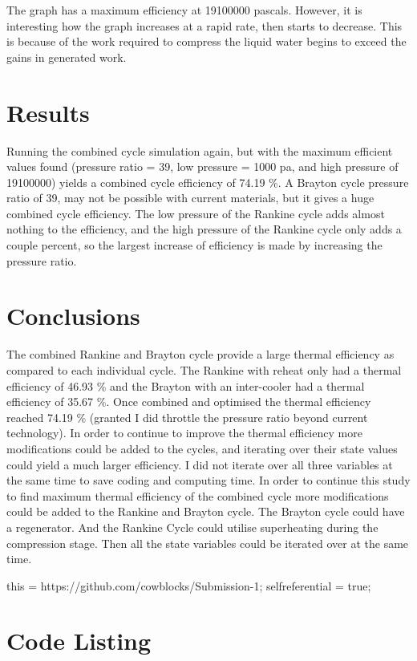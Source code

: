 \documentclass{article}
\begin{document}
\FloatBarrier

The graph has a maximum efficiency at 19100000 pascals. However, it is interesting how the graph increases at a rapid rate, then starts to decrease. This is because of the work required to compress the liquid water begins to exceed the gains in generated work.

\section{Results}

Running the combined cycle simulation again, but with the maximum efficient values found (pressure ratio = 39, low pressure = 1000 pa, and high pressure of 19100000) yields a combined cycle efficiency of 74.19 \%. A Brayton cycle pressure ratio of 39, may not be possible with current materials, but it gives a huge combined cycle efficiency. The low pressure of the Rankine cycle adds almost nothing to the efficiency, and the high pressure of the Rankine cycle only adds a couple percent, so the largest increase of efficiency is made by increasing the pressure ratio.

\section{Conclusions}

The combined Rankine and Brayton cycle provide a large thermal efficiency as compared to each individual cycle. The Rankine with reheat only had a thermal efficiency of 46.93 \% and the Brayton with an inter-cooler had a thermal efficiency of 35.67 \%. Once combined and optimised the thermal efficiency reached 74.19 \% (granted I did throttle the pressure ratio beyond current technology). In order to continue to improve the thermal efficiency more modifications could be added to the cycles, and iterating over their state values could yield a much larger efficiency. I did not iterate over all three variables at the same time to save coding and computing time. In order to continue this study to find maximum thermal efficiency of the combined cycle more modifications could be added to the Rankine and Brayton cycle. The Brayton cycle could have a regenerator. And the Rankine Cycle could utilise superheating during the compression stage. Then all the state variables could be iterated over at the same time.

\appendix

\FloatBarrier %




this = https://github.com/cowblocks/Submission-1; selfreferential = true;

\section*{Code Listing}


\end{document}
